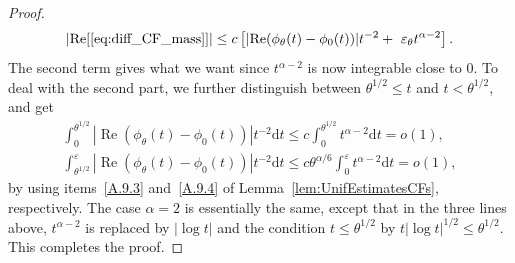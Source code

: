 \documentclass[10pt]{amsart}
\theoremstyle{definition}\newtheorem{defi}[theo]{Definition}\newtheorem{rema}[theo]{Remark}\newtheorem{exam}[theo]{Example}\newtheorem{exem}[theo]{Example}\newtheorem{nota}[theo]{Notation}
\DeclareMathOperator{\re}{Re}
\newcommand{\ga}{\alpha}
\newcommand{\gep}{\varepsilon}
\newcommand{\gt}{\theta}
\newcommand{\dd}{\mathrm{d}}
\begin{document}
\begin{proof}
\begin{equation}
\mathopen{|}\re[\eqref{eq:diff_CF_mass}]| \le c
\left[
\mathopen{|} \re(\phi_\gt(t) - \phi_0(t))| t^{-2} +\
\gep_\gt t^{\ga - 2}\right].
\end{equation} The second term gives what we want since $t^{\ga-2}$ is now integrable close to $0$. To deal with the second part, we further distinguish between $\gt^{1/2} \le t$ and $t < \gt^{1/2}$, and get
\begin{gather}
\int_0^{\theta^{1/2}} |{\re(\phi_\gt(t) - \phi_0(t))}| t^{-2} \dd t \le c \int_0^{\theta^{1/2}} t^{\ga-2} \dd t= o(1),
\\
\int_{\theta^{1/2}}^\gep |{\re(\phi_\gt(t) - \phi_0(t))}| t^{-2} \dd t \le c \gt^{\ga/6} \int_0^{\gep} t^{\ga-2} \dd t = o(1),
\end{gather}
by using items~\eqref{A.9.3} and~\eqref{A.9.4} of Lemma~\ref{lem:UnifEstimatesCFs}, respectively. The case $\ga = 2$ is essentially the same, except that in the three lines above, $t^{\ga-2}$ is replaced by $|\log t|$ and the condition $t\le \gt^{1/2}$ by $t|\log t|^{1/2}\le \gt^{1/2}$. This completes the proof.
\end{proof}
\end{document}
